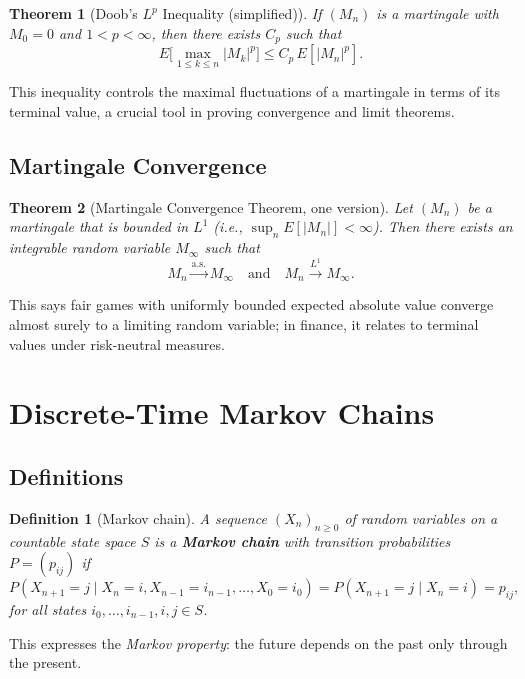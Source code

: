 \documentclass[11pt,a4paper]{article}
\newtheorem{definition}{Definition}[section]
\newtheorem{theorem}{Theorem}[section]
\numberwithin{equation}{section}
\begin{document}
\begin{theorem}[Doob's $L^p$ Inequality (simplified)]
If $(M_n)$ is a martingale with $M_0=0$ and $1<p<\infty$, then there exists $C_p$ such that
\[
E\big[\max_{1\le k\le n} |M_k|^p\big]
\le C_p\, E[|M_n|^p].
\]
\end{theorem}

This inequality controls the maximal fluctuations of a martingale in terms of its terminal value, a crucial tool in proving convergence and limit theorems.

\subsection{Martingale Convergence}

\begin{theorem}[Martingale Convergence Theorem, one version]
Let $(M_n)$ be a martingale that is bounded in $L^1$ (i.e., $\sup_n E[|M_n|]<\infty$). 
Then there exists an integrable random variable $M_\infty$ such that
\[
M_n \xrightarrow{\text{a.s.}} M_\infty
\quad\text{and}\quad
M_n \xrightarrow{L^1} M_\infty.
\]
\end{theorem}

This says fair games with uniformly bounded expected absolute value converge almost surely to a limiting random variable; in finance, it relates to terminal values under risk-neutral measures.

\newpage

\section{Discrete-Time Markov Chains}
\label{sec:markov}

\subsection{Definitions}

\begin{definition}[Markov chain]
A sequence $(X_n)_{n\ge 0}$ of random variables on a countable state space $S$ is a \textbf{Markov chain} with transition probabilities $P=(p_{ij})$ if
\[
P(X_{n+1}=j \mid X_n=i, X_{n-1}=i_{n-1},\dots,X_0=i_0)
= P(X_{n+1}=j \mid X_n=i) = p_{ij},
\]
for all states $i_0,\dots,i_{n-1},i,j\in S$.
\end{definition}

This expresses the \emph{Markov property}: the future depends on the past only through the present.
\end{document}

